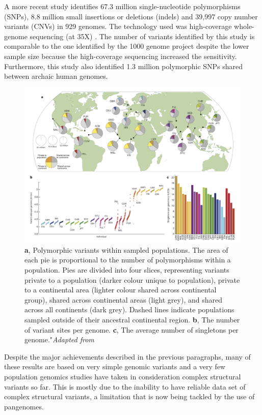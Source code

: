A more recent study identifies 67.3 million single-nucleotide polymorphisms (SNPs), 8.8 million small insertions or deletions (indels) and 39,997 copy number variants (CNVs) in 929 genomes. The technology used was high-coverage whole-genome sequencing (at 35X) \cite{bergstrom2019insights}. The number of variants identified by this study is comparable to the one identified by the 1000 genome project despite the lower sample size because the high-coverage sequencing increased the sensitivity. Furthermore, this study also identified 1.3 million polymorphic SNPs shared between archaic human genomes.\\


\begin{figure}[H]
\centering
\includegraphics[width=1\textwidth]{fig/1000genome_grid.png}
\decoRule
\caption{\textbf{a}, Polymorphic variants within sampled populations. The area of each pie is proportional to the number of polymorphisms within a population. Pies are divided into four slices, representing variants private to a population (darker colour unique to population), private to a continental area (lighter colour shared across continental group), shared across continental areas (light grey), and shared across all continents (dark grey). Dashed lines indicate populations sampled outside of their ancestral continental region. \textbf{b}, The number of variant sites per genome. \textbf{c}, The average number of singletons per genome."\textit{Adapted from} \cite{1000genome2015global}}
\label{fig:1000genome_grid}
\end{figure}

Despite the major achievements described in the previous paragraphs, many of these results are based on very simple genomic variants and a very few population genomics studies have taken in consideration complex structural variants so far. %
This is mostly due to the inability to have reliable data set of complex structural variants, a limitation that is now being tackled by the use of pangenomes.

